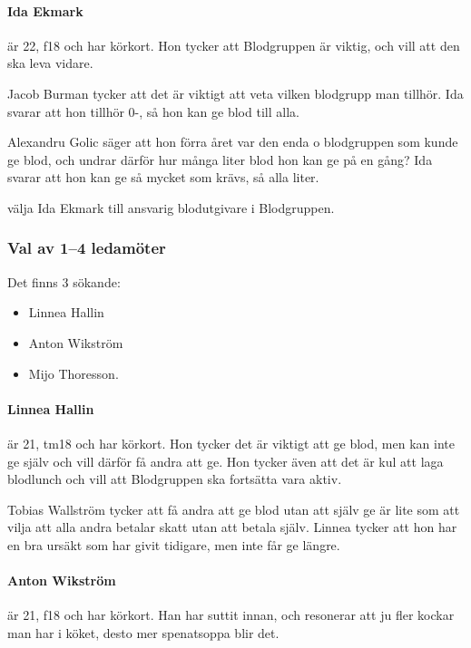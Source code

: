 \documentclass[hidelinks]{sektionsmote}
\begin{document}
\paragraph{Ida Ekmark} är 22, f18 och har körkort.
Hon tycker att Blodgruppen är viktig, och vill att den ska leva vidare.

Jacob Burman tycker att det är viktigt att veta vilken blodgrupp man tillhör.
Ida svarar att hon tillhör 0-, så hon kan ge blod till alla.

Alexandru Golic säger att hon förra året var den enda o blodgruppen som kunde ge blod, och undrar därför hur många liter blod hon kan ge på en gång?
Ida svarar att hon kan ge så mycket som krävs, så alla liter.

\begin{beslut}
  \item välja Ida Ekmark till ansvarig blodutgivare i Blodgruppen.
\end{beslut}


\subsubsection{Val av 1--4 ledamöter}
Det finns 3 sökande:
\begin{itemize}
    \item Linnea Hallin
    \item Anton Wikström
    \item Mijo Thoresson.
\end{itemize}

\paragraph{Linnea Hallin} är 21, tm18 och har körkort.
Hon tycker det är viktigt att ge blod, men kan inte ge själv och vill därför få andra att ge.
Hon tycker även att det är kul att laga blodlunch och vill att Blodgruppen ska fortsätta vara aktiv.

Tobias Wallström tycker att få andra att ge blod utan att själv ge är lite som att vilja att alla andra betalar skatt utan att betala själv.
Linnea tycker att hon har en bra ursäkt som har givit tidigare, men inte får ge längre.

\paragraph{Anton Wikström} är 21, f18 och har körkort.
Han har suttit innan, och resonerar att ju fler kockar man har i köket, desto mer spenatsoppa blir det.
\end{document}
